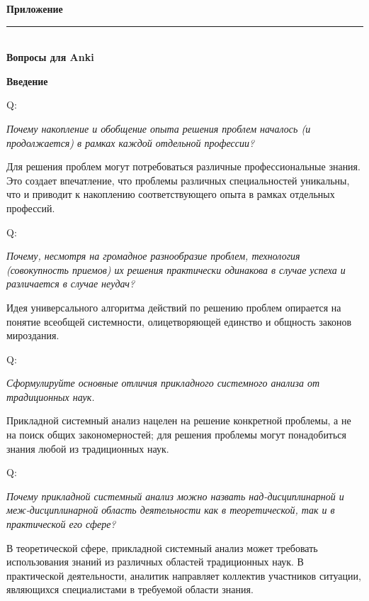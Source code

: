 \documentclass{article}
\renewcommand{\section}[2]{
	\vspace{6em}
	\begin{flushright}
	\Large
	\baselineskip=0.5\baselineskip
	\textbf{#1}
	\\
	\rule[0.5\baselineskip]{\textwidth}{0.15pt}
	\\
	\textbf{#2}
	\end{flushright}
	}
\renewcommand{\subsection}[1]{
	\vspace{2em}
	\begin{flushright}
		\large
		\textbf{#1}
	\end{flushright}
	}
\newcommand{\question}[2]{
	\begin{flushright}
		Q:\hspace{2ex}\vline\hspace{2ex}
		\begin{minipage}{0.9\textwidth}
			\large
			\textit{#1}
		\end{minipage}
	\end{flushright}
	\begin{center}
		\begin{minipage}{0.95\textwidth}
			#2
		\end{minipage}
	\end{center}
	}
\begin{document}
\newpage
\section{Приложение}{Вопросы для Anki}
\subsection{Введение}
\question{Почему накопление и обобщение опыта решения проблем началось (и продолжается) в рамках каждой отдельной профессии?}{Для решения проблем могут потребоваться различные профессиональные знания. Это создает впечатление, что проблемы различных специальностей уникальны, что и приводит к накоплению соответствующего опыта в рамках отдельных профессий.}
\question{Почему, несмотря на громадное разнообразие проблем, технология (совокупность приемов) их решения практически одинакова в случае успеха и различается в случае неудач?}{Идея универсального алгоритма действий по решению проблем опирается на понятие всеобщей системности, олицетворяющей единство и общность законов мироздания.}
\question{Сформулируйте основные отличия прикладного системного анализа от традиционных наук.}{Прикладной системный анализ нацелен на решение конкретной проблемы, а не на поиск общих закономерностей; для решения проблемы могут понадобиться знания любой из традиционных наук.}
\question{Почему прикладной системный анализ можно назвать над-дисциплинарной и меж-дисциплинарной область деятельности как в теоретической, так и в практической его сфере?}{В теоретической сфере, прикладной системный анализ может требовать использования знаний из различных областей традиционных наук. В практической деятельности, аналитик направляет коллектив участников ситуации, являющихся специалистами в требуемой области знания.}
\end{document}
